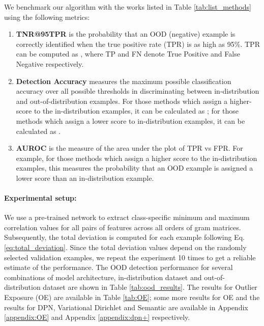 \documentclass{article}
\begin{document}
We benchmark our algorithm with the works listed in Table \ref{tab:list_methods} using the following metrics:
\begin{enumerate}[noitemsep,topsep=2pt,parsep=5pt,partopsep=0pt]
    \item \textbf{TNR@95TPR} is the probability that an OOD (negative) example is correctly identified when the true positive rate (TPR) is as high as 95\%. TPR can be computed as , where TP and FN denote True Positive and False Negative respectively.
    \item \textbf{Detection Accuracy} measures the maximum possible classification accuracy over all possible thresholds in discriminating between in-distribution and out-of-distribution examples. For those methods which assign a higher-score to the in-distribution examples, it can be calculated as ; for those methods which assign a lower score to in-distribution examples, it can be calculated as .
    \item  \textbf{AUROC} is the measure of the area under the plot of TPR vs FPR. For example, for those methods which assign a higher score to the in-distribution examples, this measures the probability that an OOD example is assigned a lower score than an in-distribution example.
\end{enumerate}

\paragraph{Experimental setup:} We use a pre-trained network to extract class-specific minimum and maximum correlation values for all pairs of features across all orders of gram matrices. Subsequently, the total deviation is computed for each example following Eq. \ref{eq:total_deviation}. Since the total deviation values depend on the randomly selected validation examples, we repeat the experiment 10 times to get a reliable estimate of the performance. The OOD detection performance for several combinations of model architecture, in-distribution dataset and out-of-distribution dataset are shown in Table \ref{tab:ood_results}. The results for Outlier Exposure (OE) are available in Table \ref{tab:OE}; some more results for OE and the results for DPN, Variational Dirichlet and Semantic are available in Appendix \ref{appendix:OE} and Appendix \ref{appendix:dpn+} respectively.
\end{document}
